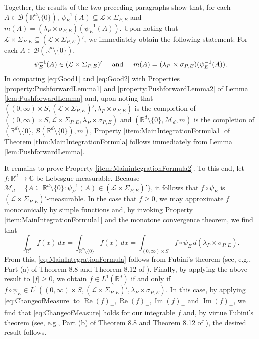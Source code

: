 \documentclass[smallextended]{svjour3}
\theoremstyle{remark}
\renewenvironment{proof}[1][\proofname]{\renewcommand\xproofname{#1}\xproof}{\endxproof}
\renewcommand\Re{\operatorname{Re}}%
\renewcommand\Im{\operatorname{Im}}
\begin{document}
\begin{proof}[Proof of Theorem \ref{thm:MainIntegrationFormula}]
Together, the results of the two preceding paragraphs show that, for each $A\in\mathcal{B}(\mathbb{R}^d\setminus\{0\})$, $\psi_E^{-1}(A)\subseteq \mathcal{L}\times\Sigma_{P,E}$ and $m(A)=(\lambda_P\times\sigma_{P,E})(\psi_E^{-1}(A))$. Upon noting that $\mathcal{L}\times\Sigma_{P,E}\subseteq (\mathcal{L}\times\Sigma_{P,E})'$, we immediately obtain the following statement: For each $A\in\mathcal{B}(\mathbb{R}^d\setminus\{0\})$,
\begin{equation}\label{eq:Good2}
\psi_E^{-1}(A)\in (\mathcal{L}\times\Sigma_{P,E})'\hspace{0.5cm}\mbox{and}\hspace{0.5cm}m(A)=(\lambda_P\times\sigma_{P,E})(\psi_E^{-1}(A)).
\end{equation}
In comparing \eqref{eq:Good1} and \eqref{eq:Good2} with Properties \ref{property:PushforwardLemma1} and \ref{property:PushforwardLemma2} of Lemma \ref{lem:PushforwardLemma} and, upon noting that $((0,\infty)\times S,(\mathcal{L}\times\Sigma_{P,E})',\lambda_P\times\sigma_{P,E})$ is the completion of $((0,\infty)\times S,\mathcal{L}\times\Sigma_{P,E},\lambda_P\times\sigma_{P,E})$ and $(\mathbb{R}^d\setminus\{0\},\mathcal{M}_d,m)$ is the completion of $(\mathbb{R}^d\setminus\{0\},\mathcal{B}(\mathbb{R}^d\setminus\{0\}),m)$, Property \ref{item:MainIntegrationFormula1} of Theorem \ref{thm:MainIntegrationFormula} follows immediately from Lemma \ref{lem:PushforwardLemma}.

It remains to prove Property \ref{item:MainintegrationFormula2}. To this end, let $f:\mathbb{R}^d\to\mathbb{C}$ be Lebesgue measurable. Because $\mathcal{M}_d=\{A\subseteq \mathbb{R}^d\setminus\{0\}:\psi_E^{-1}(A)\in(\mathcal{L}\times\Sigma_{P,E})'\}$, it follows that $f\circ\psi_E$ is $(\mathcal{L}\times\Sigma_{P,E})'$-measurable. In the case that $f\geq 0$, we may approximate $f$ monotonically by simple functions and, by invoking Property \ref{item:MainIntegrationFormula1} and the monotone convergence theorem, we find that
\begin{equation}\label{eq:ChangeofMeasure}
\int_{\mathbb{R}^d}f(x)\,dx=\int_{\mathbb{R}^d\setminus \{0\}}f(x)\,dx=\int_{(0,\infty)\times S}f\circ \psi_E\, d(\lambda_P\times\sigma_{P,E}).
\end{equation}
From this, \eqref{eq:MainIntegrationFormula} follows from Fubini's theorem (see, e.g., Part (a) of Theorem 8.8 and Theorem 8.12 of \cite{rudin_real_1987}). Finally, by applying the above result to $|f|\geq 0$, we obtain $f\in L^1(\mathbb{R}^d)$ if and only if $f\circ \psi_E\in L^1((0,\infty)\times S,(\mathcal{L}\times\Sigma_{P,E})',\lambda_P\times\sigma_{P,E})$. In this case, by applying \eqref{eq:ChangeofMeasure} to $\Re(f)_+,\Re(f)_-,\Im(f)_+$ and $\Im(f)_-$, we find that \eqref{eq:ChangeofMeasure} holds for our integrable $f$ and, by virtue Fubini's theorem (see, e.g., Part (b) of Theorem 8.8 and Theorem 8.12 of \cite{rudin_real_1987}), the desired result follows.
\end{proof}
\end{document}
